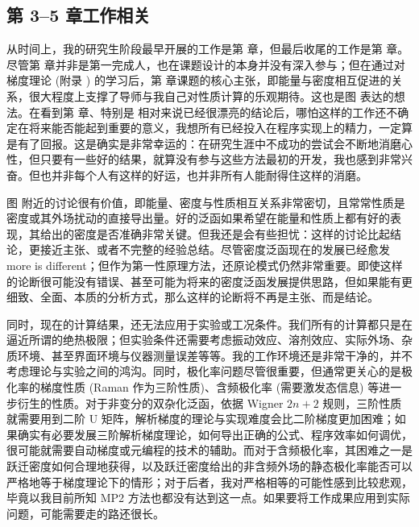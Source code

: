 \subsection*{第 3--5 章工作相关}

从时间上，我的研究生阶段最早开展的工作是第  章，但最后收尾的工作是第  章。尽管第  章并非是第一完成人，也在课题设计的本身并没有深入参与；但在通过对梯度理论 (附录 ) 的学习后，第  章课题的核心主张，即能量与密度相互促进的关系，很大程度上支撑了导师与我自己对性质计算的乐观期待。这也是图  表达的想法。在看到第  章、特别是  相对来说已经很漂亮的结论后，哪怕这样的工作还不确定在将来能否能起到重要的意义，我想所有已经投入在程序实现上的精力，一定算是有了回报。这是确实是非常幸运的：在研究生涯中不成功的尝试会不断地消磨心性，但只要有一些好的结果，就算没有参与这些方法最初的开发，我也感到非常兴奋。但也并非每个人有这样的好运，也并非所有人能耐得住这样的消磨。

图  附近的讨论很有价值，即能量、密度与性质相互关系非常密切，且常常性质是密度或其外场扰动的直接导出量。好的泛函如果希望在能量和性质上都有好的表现，其给出的密度是否准确非常关键。但我还是会有些担忧：这样的讨论比起结论，更接近主张、或者不完整的经验总结。尽管密度泛函现在的发展已经愈发 more is different\cite{Anderson-Anderson.S.1972}；但作为第一性原理方法，还原论模式仍然非常重要。即使这样的论断很可能没有错误、甚至可能为将来的密度泛函发展提供思路，但如果能有更细致、全面、本质的分析方式，那么这样的论断将不再是主张、而是结论。

同时，现在的计算结果，还无法应用于实验或工况条件。我们所有的计算都只是在逼近所谓的绝热极限；但实验条件还需要考虑振动效应、溶剂效应、实际外场、杂质环境、甚至界面环境与仪器测量误差等等\cite{Mata-Suhm.ACIE.2017, Varandas-Varandas.ARPC.2018}。我的工作环境还是非常干净的，并不考虑理论与实验之间的鸿沟。同时，极化率问题尽管很重要，但通常更关心的是极化率的梯度性质 (Raman 作为三阶性质)、含频极化率 (需要激发态信息) 等进一步衍生的性质。对于非变分的双杂化泛函，依据 Wigner $2n+2$ 规则，三阶性质就需要用到二阶 U 矩阵，解析梯度的理论与实现难度会比二阶梯度更加困难；如果确实有必要发展三阶解析梯度理论，如何导出正确的公式、程序效率如何调优，很可能就需要自动梯度或元编程的技术的辅助。而对于含频极化率，其困难之一是跃迁密度如何合理地获得，以及跃迁密度给出的非含频外场的静态极化率能否可以严格地等于梯度理论下的情形；对于后者，我对严格相等的可能性感到比较悲观，毕竟以我目前所知 MP2 方法也都没有达到这一点。如果要将工作成果应用到实际问题，可能需要走的路还很长。

